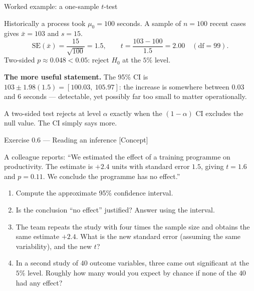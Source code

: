 \documentclass[aspectratio=169,11pt]{beamer}
\begin{document}
\begin{frame}{Worked example: a one-sample $t$-test}
  \footnotesize
  \begin{numexample}
    Historically a process took $\mu_0 = 100$ seconds. A sample of $n = 100$
    recent cases gives $\bar x = 103$ and $s = 15$.
    \[
      \mathrm{SE}(\bar x) = \frac{15}{\sqrt{100}} = 1.5,
      \qquad
      t = \frac{103 - 100}{1.5} = 2.00 \quad (\text{df} = 99).
    \]
    Two-sided $p \approx 0.048 < 0.05$: reject $H_0$ at the $5\%$ level.

    \textbf{The more useful statement.} The 95\% CI is
    $103 \pm 1.98(1.5) = [100.03,\ 105.97]$: the increase is somewhere
    between $0.03$ and $6$ seconds --- detectable, yet possibly far too small
    to matter operationally.
  \end{numexample}
  \begin{takeaway}
    A two-sided test rejects at level $\alpha$ exactly when the
    $(1-\alpha)$ CI excludes the null value. The CI simply says more.
  \end{takeaway}
\end{frame}

\begin{frame}{Exercise 0.6 --- Reading an inference [Concept]}
  \begin{exercise}
    A colleague reports: ``We estimated the effect of a training programme on
    productivity. The estimate is $+2.4$ units with standard error $1.5$,
    giving $t = 1.6$ and $p = 0.11$. We conclude the programme has no
    effect.''
    \begin{enumerate}
      \item Compute the approximate 95\% confidence interval.
      \item Is the conclusion ``no effect'' justified? Answer using the
            interval.
      \item The team repeats the study with four times the sample size and
            obtains the same estimate $+2.4$. What is the new standard error
            (assuming the same variability), and the new $t$?
      \item In a second study of $40$ outcome variables, three came out
            significant at the $5\%$ level. Roughly how many would you expect
            by chance if none of the $40$ had any effect?
    \end{enumerate}
  \end{exercise}
\end{frame}
\end{document}
